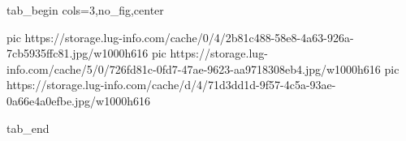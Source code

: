  
 
 
 
 


\ifcmt
  tab_begin cols=3,no_fig,center

     pic https://storage.lug-info.com/cache/0/4/2b81c488-58e8-4a63-926a-7cb5935ffc81.jpg/w1000h616%
		 pic https://storage.lug-info.com/cache/5/0/726fd81c-0fd7-47ae-9623-aa9718308eb4.jpg/w1000h616%
		 pic https://storage.lug-info.com/cache/d/4/71d3dd1d-9f57-4c5a-93ae-0a66e4a0efbe.jpg/w1000h616%

  tab_end
\fi
